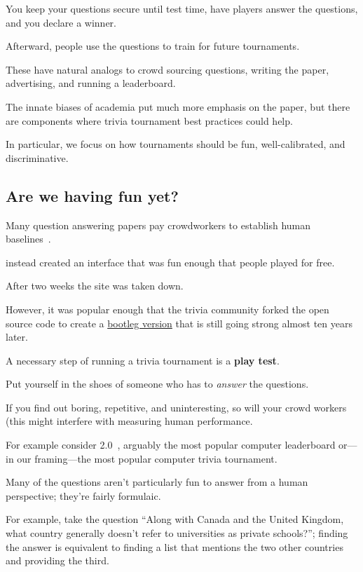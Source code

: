You keep your questions secure until test time, have players answer the questions, and you declare a winner. 

Afterward, people use the questions to train for future tournaments.

These have natural analogs to crowd sourcing questions, writing the paper, advertising, and running a leaderboard. 

The innate biases of academia put much more emphasis on the paper, but there are components where trivia tournament best practices could help. 

In particular, we focus on how tournaments should be fun, well-calibrated, and discriminative.

\subsection{Are we having fun yet?}
\label{sec:fun}

Many question answering papers pay crowdworkers to establish human baselines~\cite{rajpurkar-16,choi-18}.

 instead created an interface that was fun enough that people played for free.

After two weeks the site was taken down.

However, it was popular enough that the trivia community forked the open source code to create a \href{https://protobowl.com/}{bootleg version} that is still going strong almost ten years later.

A necessary step of running a trivia tournament is a {\bf play test}.

Put yourself in the shoes of someone who has to \emph{answer} the questions.

If you find out boring, repetitive, and uninteresting, so will your crowd workers (this might interfere with measuring human performance. 

For example consider \squad{} 2.0~\cite{rajpurkar-18}, arguably the most popular computer  leaderboard or---in our framing---the most popular computer trivia tournament.

Many of the questions aren't particularly fun to answer from a human perspective; they're fairly formulaic.  

For example, take the question ``Along with Canada and the United Kingdom, what country generally doesn't refer to universities as private schools?''; finding the answer is equivalent to finding a list that mentions the two other countries and providing the third.

